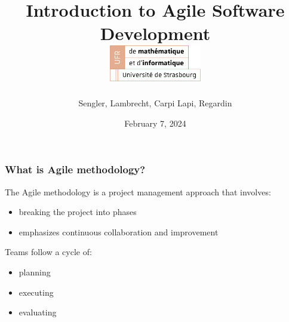\documentclass[10pt]{beamer}
\title[Introduction to Agile Software Development]{
  Introduction to Agile Software Development \\
  \vspace{1cm}
  \includegraphics[width=4cm]{logo_ufr.png}
}
\author[SuperAgile]{Sengler, Lambrecht, Carpi Lapi, Regardin}
\date[February 7, 2024]{February 7, 2024}
\begin{document}
\frame{\titlepage}

\begin{frame}
\frametitle{What is Agile methodology?}
The Agile methodology is a project management approach that involves:
\begin{itemize}
    \item breaking the project into phases
    \item emphasizes continuous collaboration and improvement \\
    \vspace{1cm}
\end{itemize}

Teams follow a cycle of: 
\begin{itemize}
    \item planning
    \item executing
    \item evaluating
\end{itemize}

\end{frame}

\begin{frame}
    
\end{frame}

\begin{frame}
    
\end{frame}
\end{document}
